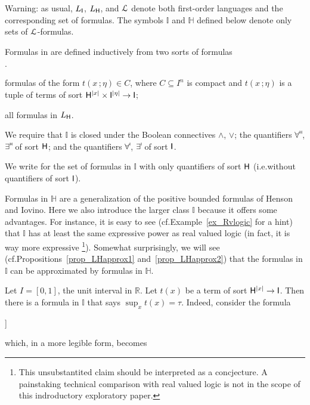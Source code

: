 \documentclass[10pt,oneside]{amsproc}
\newcommand{\mylabel}[1]{{#1}\hfill}
\renewenvironment{itemize}
  {\begin{list}{$\cdot$}{%
  \setlength{\parskip}{0mm}
  \setlength{\topsep}{.4\baselineskip}
  \setlength{\rightmargin}{0mm}
  \setlength{\listparindent}{0mm}
  \setlength{\itemindent}{0mm}
  \setlength{\labelwidth}{3ex}
  \setlength{\itemsep}{.2\baselineskip}
  \setlength{\parsep}{.2\baselineskip}
  \setlength{\partopsep}{0mm}
  \setlength{\labelsep}{1ex}
  \setlength{\leftmargin}{\labelwidth+\labelsep}
  \let\makelabel\mylabel}}{%
\end{list}}
\renewcommand*{\emph}[1]{%
   \smash{\tikz[baseline]\node[rectangle, fill=teal!25, rounded corners, inner xsep=0.5ex, inner ysep=0.2ex, anchor=base, minimum height = 2.7ex]{#1};}}
\begin{document}
Warning: as usual, $L_{\sf I}$, $L_{\sf H}$, and ${\EuScript L}$ denote both first-order languages and the corresponding set of formulas.
The symbols $\mathds{I}$ and $\mathds{H}$ defined below denote only sets of ${\EuScript L}$-formulas.

\begin{definition}\label{def_LL}
  Formulas in \emph{$\mathds{I}$\/} are defined inductively from two sorts of \emph{$\mathds{I}$-atomic\/} formulas
  \begin{itemize}
  \item[i.] formulas of the form $t(x\,;\eta)\in C$, where $C\subseteq I^n$ is compact and $t(x\,;\eta)$ is a tuple of terms of sort ${\sf H}^{|x|}\times {\sf I}^{|\eta|}\to {\sf I}$; 
  \item[ii.] all formulas in $L_{\sf H}$.
  \end{itemize}
  We require that $\mathds{I}$ is closed under the Boolean connectives $\wedge$, $\vee$; the quantifiers $\forallH$, $\existsH $ of sort ${\sf H}$; and the quantifiers $\forallI $, $\existsI$ of sort ${\sf I}$.

  We write \emph{$\mathds{H}$ \/} for the set of formulas in $\mathds{I}$ with only quantifiers of sort ${\sf H}$ (i.e.\@ without quantifiers of sort ${\sf I}$).
\end{definition}

Formulas in $\mathds{H}$ are a generalization of the positive bounded formulas of Henson and Iovino.
Here we also introduce the larger class $\mathds{I}$ because it offers some advantages. 
For instance, it is easy to see (cf.\@ Example~\ref{ex_Rvlogic} for a hint) that $\mathds{I}$ has at least the same expressive power as real valued logic (in fact, it is way more expressive%
\footnote{This unsubstantited claim should be interpreted as a concjecture.
A painstaking technical comparison with real valued logic is not in the scope of this indroductory exploratory paper.}).
Somewhat surprisingly, we will see (cf.\@ Propositions~\ref{prop_LHapprox1} and~\ref{prop_LHapprox2}) that the formulas in $\mathds{I}$ can be approximated by formulas in $\mathds{H}$.

\begin{example}\label{ex_Rvlogic}
  Let $I=[0,1]$, the unit interval in $\mathds{R}$.
  Let $t(x)$ be a term of sort ${\sf H}^{|x|}\to {\sf I}$.
  Then there is a formula in $\mathds{I}$ that says $\sup_{x} t(x)=\tau$.
  Indeed, consider the formula

  {\wedge}{\forallI \varepsilon \Big[\varepsilon\in\{0\}\ \vee\ \existsH x\ \big[\tau\dotminus (t(x)+\varepsilon)\in\{0\}\big]\Big]}

  which, in a more legible form, becomes

\end{example}
\end{document}
